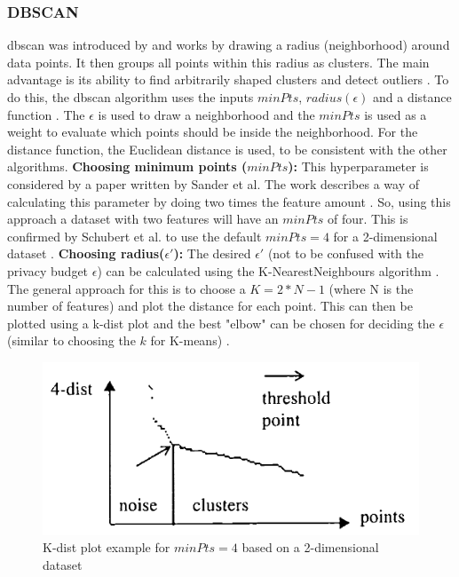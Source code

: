\subsubsection{DBSCAN} \label{theory:clustering-dbscan}
\gls{dbscan} was introduced by \citep{ester_density-based_nodate} and works by drawing a radius (neighborhood) around data points.
It then groups all points within this radius as clusters. The main advantage is its ability to find arbitrarily shaped clusters and detect outliers \citep{liu_privacy_2012}.
To do this, the \gls{dbscan} algorithm uses the inputs $minPts$, $radius(\epsilon)$ and a distance function \citep{schubert_dbscan_2017}.
The $\epsilon$ is used to draw a neighborhood and the $minPts$ is used as a weight to evaluate which points should be inside the neighborhood.
For the distance function, the Euclidean distance is used, to be consistent with the other algorithms. \newline
\textbf{Choosing minimum points ($minPts$):} This hyperparameter is considered by a paper written by Sander et al.
The work describes a way of calculating this parameter by doing two times the feature amount \citep{sander_density-based_1998}.
So, using this approach a dataset with two features will have an $minPts$ of four.
This is confirmed by Schubert et al. to use the default $minPts = 4$ for a 2-dimensional dataset \citep{schubert_dbscan_2017}. \newpage
\textbf{Choosing radius($\epsilon'$):} The desired $\epsilon'$ (not to be confused with the privacy budget $\epsilon$) can be calculated using the K-NearestNeighbours algorithm \citep{ester_density-based_nodate,schubert_dbscan_2017}.
The general approach for this is to choose a $K = 2*N - 1$ (where N is the number of features) and plot the distance for each point.
This can then be plotted using a k-dist plot and the best "elbow" can be chosen for deciding the $\epsilon$ (similar to choosing the $k$ for K-means) \citep{elbatta_dynamic_2013}.
\begin{figure}[H]
  \includegraphics{TheorethicalFramework/K-dist-elbow.png}
  \caption{K-dist plot example for $minPts = 4$ based on a 2-dimensional dataset \citep{ester_density-based_nodate}}
  \label{k-dist-plot}
\end{figure}


